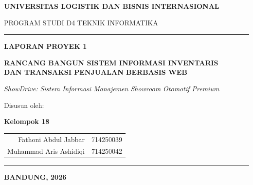 \documentclass[11pt, a5paper]{article}
\begin{document}

\begin{titlepage}
  \centering
  \vspace*{0.4cm}

  \fbox{\parbox{2.8cm}{\centering\vspace{1.3cm}
    {\small LOGO ULBI}\vspace{1.3cm}}}

  \vspace{0.5cm}
  {\large\bfseries UNIVERSITAS LOGISTIK DAN BISNIS INTERNASIONAL\par}
  \vspace{0.1cm}
  {\normalsize PROGRAM STUDI D4 TEKNIK INFORMATIKA\par}
  \vspace{0.3cm}
  \rule{\textwidth}{1pt}
  \vspace{0.3cm}

  {\Large\bfseries LAPORAN PROYEK 1\par}
  \vspace{0.5cm}
  {\large\bfseries
    RANCANG BANGUN SISTEM INFORMASI INVENTARIS\\[4pt]
    DAN TRANSAKSI PENJUALAN BERBASIS WEB\par}
  \vspace{0.25cm}
  {\small\itshape
    ShowDrive: Sistem Informasi Manajemen Showroom Otomotif Premium\par}

  \vspace{1.5cm}
  {\small Disusun oleh:\par}
  \vspace{0.4cm}
  {\large\bfseries Kelompok 18\par}
  \vspace{0.6cm}

  \begin{tabular}{rl}
    Fathoni Abdul Jabbar   & 714250039 \\[4pt]
    Muhammad Aris Ashidiqi & 714250042 \\
  \end{tabular}

  \vfill
  \rule{\textwidth}{0.4pt}
  \vspace{0.3cm}
  {\normalsize\bfseries BANDUNG, 2026\par}
\end{titlepage}
\end{document}
